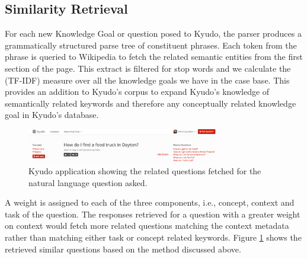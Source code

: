 \documentclass{llncs}
\begin{document}
\subsection{Similarity Retrieval}

For each new Knowledge Goal or question posed to Kyudo, the parser produces a grammatically structured parse tree of constituent phrases. Each token from the phrase is queried to Wikipedia to fetch the related semantic entities from the first section of the page. This extract is filtered for stop words and we calculate the (TF-IDF) measure over all the knowledge goals we have in the case base. This provides an addition to Kyudo's corpus to expand Kyudo's knowledge of semantically related keywords and therefore any conceptually related knowledge goal in Kyudo's database.

\begin{figure}{}
\centering
\includegraphics[width=0.75\textwidth]{figures/question.png}
\caption{\label{fig:kyudo_tfidf_similarity}Kyudo application showing the related questions fetched for the natural language question asked.}
\end{figure} 

A weight is assigned to each of the three components, i.e., concept, context and task of the question.  The responses retrieved for a question with a greater weight on context would fetch more related questions matching the context metadata rather than matching either task or concept related keywords. Figure \ref{fig:kyudo_tfidf_similarity} shows the retrieved similar questions based on the method discussed above.
\end{document}
